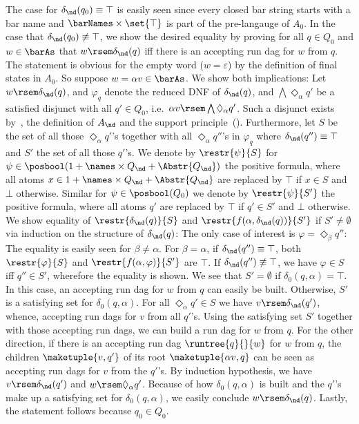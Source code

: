 \documentclass[10pt, final, conference, a4paper, twocolumn]{IEEEtran}
\begin{document}
\begin{IEEEproof}
The case for $\delta_{\nd}(q_0) \equiv \top$ is easily seen since every closed bar string
starts with a bar name and $\barNames \times \set{\top}$ is part of the pre-langauge
of $A_0$. In the case that $\delta_{\nd}(q_0) \not\equiv \top$, we show the desired
equality by proving for all $q \in Q_0$ and $w \in \barAs$ that $w \rsem \delta_{\nd}(q)$
iff there is an accepting run dag for $w$ from $q$. The statement is obvious for the
empty word ($w = \varepsilon$) by the definition of final states in $A_0$. So suppose
$w = \alpha v \in \barAs$. We show both implications: Let $w \rsem \delta_{\nd}(q)$,
and $\varphi_q$ denote the reduced DNF of $\delta_{\nd}(q)$, and $\bigwedge \Diamond_{\alpha}q'$
be a satisfied disjunct with all $q' \in Q_0$, i.e.~$\alpha v \rsem \bigwedge \Diamond_{\alpha}q'$.
Such a disjunct exists by~, the definition of $A_{\nd}$ and the
support principle~(). Furthermore, let $S$ be the set of all those
$\Diamond_{\alpha}q'$'s together with all $\Diamond_{\alpha}q''$'s in $\varphi_q$ where
$\delta_{\nd}(q'') \equiv \top$ and $S'$ the set of all those $q'$'s. We denote by $\restr{\psi}{S}$
for $\psi \in \posbool(1 + \names \times Q_{\nd} + \Abstr{Q_{\nd}})$ the positive formula,
where all atoms $x \in 1 + \names \times Q_{\nd} + \Abstr{Q_{\nd}}$ are replaced by
$\top$ if $x \in S$ and $\bot$ otherwise. Similar for $\psi \in \posbool(Q_0)$ we denote
by $\restr{\psi}{S'}$ the positive formula, where all atoms $q'$ are replaced by $\top$
if $q' \in S'$ and $\bot$ otherwise. We show equality of $\restr{\delta_{\nd}(q)}{S}$
and $\restr{f(\alpha, \delta_{\nd}(q))}{S'}$ if $S' \neq \emptyset$ via induction on the
structure of $\delta_{\nd}(q)$: The only case of interest is $\varphi = \Diamond_{\beta} q''$:
The equality is easily seen for $\beta \neq \alpha$. For $\beta = \alpha$, if
$\delta_{\nd}(q'') \equiv \top$, both $\restr{\varphi}{S}$ and $\restr{f(\alpha, \varphi)}{S'}$
are $\top$. If $\delta_{\nd}(q'') \not\equiv \top$, we have $\varphi \in S$ iff
$q'' \in S'$, wherefore the equality is shown.
We see that $S' = \emptyset$ if $\delta_0(q, \alpha) = \top$. In this case, an accepting run
dag for $w$ from $q$ can easily be built. Otherwise, $S'$ is a satisfying set for $\delta_0(q, \alpha)$.
For all $\Diamond_\alpha q' \in S$ we have $v \rsem \delta_{\nd}(q')$, whence, accepting run dags
for $v$ from all $q'$'s.
Using the satisfying set $S'$ together with those accepting run dags, we can build a run dag for
$w$ from $q$.
For the other direction, if there is an accepting run dag $\runtree{q}{}{w}$ for $w$ from $q$, the
children $\maketuple{v, q'}$ of its root $\maketuple{\alpha v, q}$ can be seen as accepting run dags for $v$
from the $q'$'s. By induction hypothesis, we have $v \rsem \delta_{\nd}(q')$ and $w \rsem \Diamond_{\alpha}q'$.
Because of how $\delta_0(q, \alpha)$ is built and the $q'$'s make up a satisfying set for $\delta_0(q, \alpha)$,
we easily conclude $w \rsem \delta_{\nd}(q)$. Lastly, the statement follows because $q_0 \in Q_0$.
\end{IEEEproof}
\end{document}
